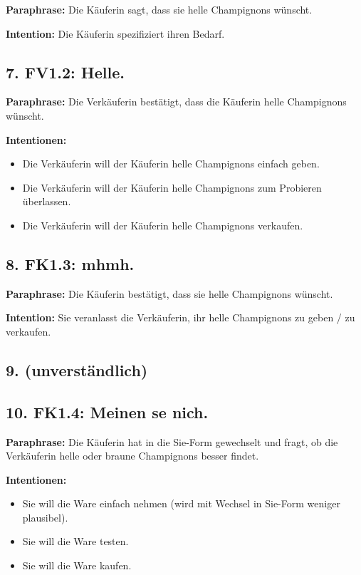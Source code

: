 \documentclass[11pt]{article}
\begin{document}
\textbf{Paraphrase:} Die Käuferin sagt, dass sie helle Champignons wünscht.

\textbf{Intention:} Die Käuferin spezifiziert ihren Bedarf.

\subsection*{7. FV1.2: Helle.}

\textbf{Paraphrase:} Die Verkäuferin bestätigt, dass die Käuferin helle Champignons wünscht.

\textbf{Intentionen:}
\begin{itemize}
    \item Die Verkäuferin will der Käuferin helle Champignons einfach geben.
    \item Die Verkäuferin will der Käuferin helle Champignons zum Probieren überlassen.
    \item Die Verkäuferin will der Käuferin helle Champignons verkaufen.
\end{itemize}

\subsection*{8. FK1.3: mhmh.}

\textbf{Paraphrase:} Die Käuferin bestätigt, dass sie helle Champignons wünscht.

\textbf{Intention:} Sie veranlasst die Verkäuferin, ihr helle Champignons zu geben / zu verkaufen.

\subsection*{9. (unverständlich)}

\subsection*{10. FK1.4: Meinen se nich.}

\textbf{Paraphrase:} Die Käuferin hat in die Sie-Form gewechselt und fragt, ob die Verkäuferin helle oder braune Champignons besser findet.

\textbf{Intentionen:}
\begin{itemize}
    \item Sie will die Ware einfach nehmen (wird mit Wechsel in Sie-Form weniger plausibel).
    \item Sie will die Ware testen.
    \item Sie will die Ware kaufen.
\end{itemize}
\end{document}
